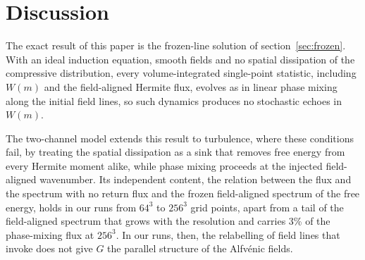 \section{Discussion}\label{sec:discussion}

The exact result of this paper is the frozen-line solution of section~\ref{sec:frozen}. With an ideal induction equation, smooth fields and no spatial dissipation of the compressive distribution, every volume-integrated single-point statistic, including $W(m)$ and the field-aligned Hermite flux, evolves as in linear phase mixing along the initial field lines, so such dynamics produces no stochastic echoes in $W(m)$.

The two-channel model extends this result to turbulence, where these conditions fail, by treating the spatial dissipation as a sink that removes free energy from every Hermite moment alike, while phase mixing proceeds at the injected field-aligned wavenumber. Its independent content, the relation between the flux and the spectrum with no return flux and the frozen field-aligned spectrum of the free energy, holds in our runs from $64^3$ to $256^3$ grid points, apart from a tail of the field-aligned spectrum that grows with the resolution and carries 3\% of the phase-mixing flux at $256^3$. In our runs, then, the relabelling of field lines that \citet{Meyrand2019} invoke does not give $G$ the parallel structure of the Alfv\'enic fields.


